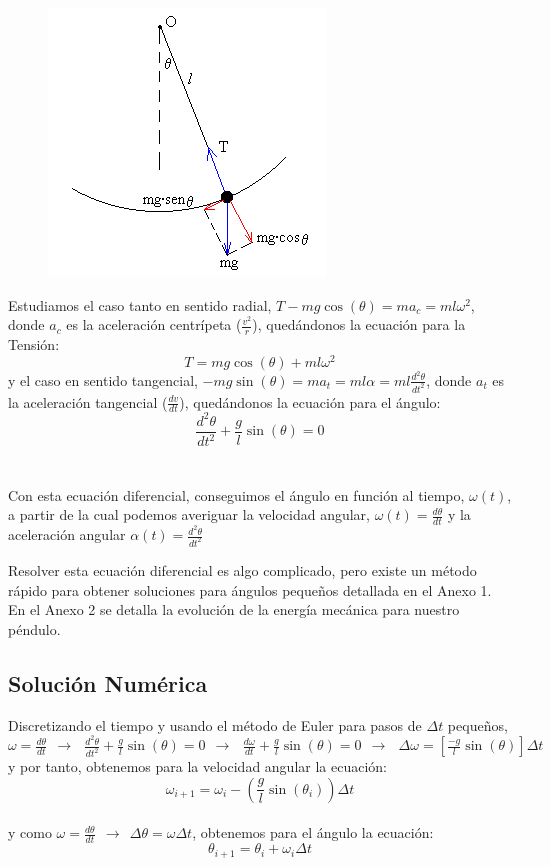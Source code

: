 \documentclass{article}
\begin{document}
\begin{figure}[h]
\centering
\includegraphics[width=.35\textwidth]{fotos/diagrama.png}
\end{figure}

Estudiamos el caso tanto en sentido radial, $ T - m g \cos(\theta) = m a_{c} = m l \omega^{2}$, donde $a_{c}$ es la aceleración centrípeta ($\frac{v^{2}}{r}$), quedándonos la ecuación para la Tensión: \[ \boxed{T = m g \cos(\theta) + m l \omega^{2}}\] y el caso en sentido tangencial, $ -m g \sin(\theta) = m a_{t} = m l \alpha = m l \frac{d^{2}\theta}{dt^{2}}$, donde $a_{t}$ es la aceleración tangencial ($\frac{dv}{dt}$), quedándonos la ecuación para el ángulo: \[\boxed{\frac{d^{2}\theta}{dt^{2}} + \frac{g}{l} \sin(\theta) = 0}\] \\\\ Con esta ecuación diferencial, conseguimos el ángulo en función al tiempo, $ \omega(t)$, a partir de la cual podemos averiguar la velocidad angular, $\omega(t) = \frac{d\theta}{dt}$ y la aceleración angular $\alpha(t) = \frac{d^{2}\theta}{dt^{2}}$

Resolver esta ecuación diferencial es algo complicado, pero existe un método rápido para obtener soluciones para ángulos pequeños detallada en el Anexo 1. En el Anexo 2 se detalla la evolución de la energía mecánica para nuestro péndulo.

\subsection{Solución Numérica}
Discretizando el tiempo y usando el método de Euler para pasos de $\Delta t$ pequeños, \\
$\omega = \frac{d\theta}{dt}\ \ \longrightarrow\ \ \ \frac{d^{2}\theta}{dt^{2}} + \frac{g}{l}\sin(\theta) = 0\ \ \longrightarrow\ \ \ \frac{d\omega}{dt} + \frac{g}{l}\sin(\theta) = 0\ \ \longrightarrow\ \ \ \Delta\omega = \left[ \frac{-g}{l}\sin(\theta)\right] \Delta t$ \\
y por tanto, obtenemos para la velocidad angular la ecuación: \[ \boxed{\omega_{i+1} = \omega_{i} - \left(\frac{g}{l}\sin(\theta_{i})\right)\Delta t}\] 
\\ y como $\omega = \frac{d\theta}{dt}\ \ \rightarrow\ \ \Delta \theta = \omega \Delta t$, obtenemos para el ángulo la ecuación: \[ \boxed{\theta_{i+1} = \theta_{i} + \omega_{i} \Delta t}\]
\end{document}
